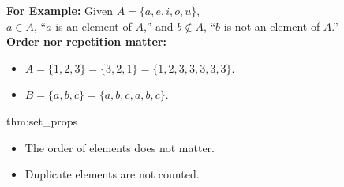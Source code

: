 \noindent
\textbf{For Example:} Given $A = \{a, e, i, o, u\}$,\\
$a \in A$, ``$a$ is an element of $A$,'' and
$b \notin A$, ``$b$ is not an element of $A$.''\\

\noindent
\textbf{Order nor repetition matter:}
\begin{itemize}
    \item $A = \{1, 2, 3\} = \{3, 2, 1\} = \{1, 2, 3, 3, 3, 3, 3\}$.
    \item $B = \{a, b, c\} = \{a, b, c, a, b, c\}$.
\end{itemize}

\begin{theo}{thm:set_props}
    \begin{itemize}
        \item The order of elements does not matter.
        \item Duplicate elements are not counted.
    \end{itemize}
\end{theo}

